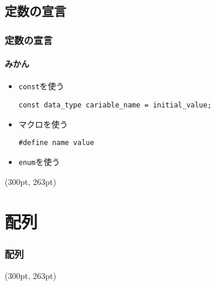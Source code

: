 \documentclass[dvipdfmx]{beamer}
\begin{document}
\subsection{定数の宣言}
\begin{frame}[c, fragile, label=55]
    \frametitle{定数の宣言}
    \framesubtitle{みかん}
    \begin{itemize}
        \item \texttt{const}を使う
            \begin{lstlisting}[gobble=16, caption=Syntax]
                const data_type cariable_name = initial_value;
            \end{lstlisting}
        \item マクロを使う
            \begin{lstlisting}[gobble=16, caption=Syntax]
                #define name value
            \end{lstlisting}
        \item \texttt{enum}を使う
    \end{itemize}
    \begin{textblock*}{0.3\linewidth}(300pt, 263pt)
    \hyperlink{54}{}
    \space
    \hyperlink{56}{}
    \end{textblock*}
\end{frame}

\section{配列}
\begin{frame}[label=56]
    \frametitle{配列}
    \tableofcontents[sections={2,10}]
    \begin{textblock*}{0.3\linewidth}(300pt, 263pt)
    \hyperlink{55}{}
    \space
    \hyperlink{57}{}
    \end{textblock*}
\end{frame}
\end{document}
